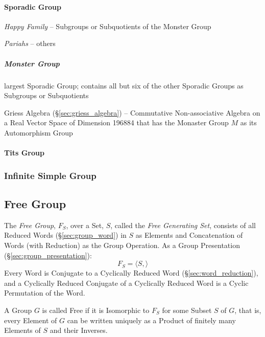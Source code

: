 \paragraph{Sporadic Group}\label{sec:sporadic_group}\hfill

\emph{Happy Family} -- Subgroups or Subquotients of the Monster Group

\emph{Pariahs} -- others



\subparagraph{Monster Group}\label{sec:monster_group}\hfill

largest Sporadic Group; contains all but six of the other Sporadic Groups as
Subgroups or Subquotients

Griess Algebra (\S\ref{sec:griess_algebra}) -- Commutative Non-associative
Algebra on a Real Vector Space of Dimension 196884 that has the Monaster Group
$M$ as its Automorphism Group



\paragraph{Tits Group}\label{sec:tits_group}\hfill



\subsubsection{Infinite Simple Group}\label{sec:infinite_simple_group}



\subsection{Free Group}\label{sec:free_group}

The \emph{Free Group}, $F_S$, over a Set, $S$, called the \emph{Free
  Generating Set}, consists of all Reduced Words
(\S\ref{sec:group_word}) in $S$ as Elements and Concatenation of Words
(with Reduction) as the Group Operation. As a Group Presentation
(\S\ref{sec:group_presentation}):
\[
    F_S = \langle S, \rangle
\]
Every Word is Conjugate to a Cyclically Reduced Word
(\S\ref{sec:word_reduction}), and a Cyclically Reduced Conjugate of a
Cyclically Reduced Word is a Cyclic Permutation of the Word.

A Group $G$ is called Free if it is Isomorphic to $F_S$ for some
Subset $S$ of $G$, that is, every Element of $G$ can be written
uniquely as a Product of finitely many Elements of $S$ and their
Inverses.

